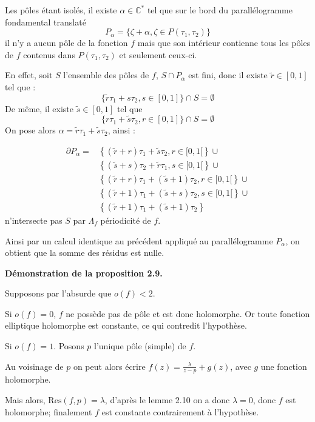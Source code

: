 \documentclass{article}
\begin{document}
Les pôles étant isolés, il existe \( \alpha \in \mathbb{C}^* \) tel que sur le bord du parallélogramme fondamental translaté 
\[
P_\alpha = \{ \zeta + \alpha, \zeta \in P(\tau_1, \tau_2)\}
\]
il n’y a aucun pôle de la fonction \( f \) mais que son intérieur contienne tous les pôles de \( f \) contenus dans \( P(\tau_1, \tau_2) \) et seulement ceux-ci.

En effet, soit \( S \) l'ensemble des pôles de \( f \), \( S \cap P_\alpha \) est fini, donc il existe \(  \tilde{r} \in [0, 1] \) tel que :
\[
\{\tilde{r}\tau_1 + s\tau_2, s \in [0, 1]\} \cap S = \emptyset
\]
De même, il existe \( \tilde{s} \in [0, 1] \) tel que 
\[
\{r\tau_1 + \tilde{s}\tau_2, r \in [0, 1]\} \cap S = \emptyset
\]
On pose alors \( \alpha = \tilde{r}\tau_1 + \tilde{s}\tau_2 \), ainsi :

\begin{align*}
    \partial P_\alpha = & \left\{ (\tilde{r}+r)\tau_1 + \tilde{s}\tau_2, r \in [0, 1[ \right\} \cup \\
                        & \left\{ (\tilde{s}+ s)\tau_2 + \tilde{r}\tau_1, s \in [0, 1[ \right\} \cup \\
                        & \left\{ (\tilde{r} + r)\tau_1 + (\tilde{s} + 1)\tau_2, r \in [0, 1[ \right\} \cup \\
                        & \left\{ (\tilde{r} + 1)\tau_1 + (\tilde{s} + s)\tau_2, s \in [0, 1[ \right\} \cup \\
                        & \left\{ (\tilde{r} + 1)\tau_1 + (\tilde{s} + 1)\tau_2 \right\}
    \end{align*}
n'intersecte pas \( S \) par \( \Lambda_f \) périodicité de \( f \).

Ainsi par un calcul identique au précédent appliqué au parallélogramme \( P_\alpha \), on obtient que la somme des résidus est nulle.


\textbf{Démonstration de la proposition 2.9.}

Supposons par l'absurde que \( o(f) < 2 \).

Si \( o(f) = 0 \), \( f \) ne possède pas de pôle et est donc holomorphe. Or toute fonction elliptique holomorphe est constante, ce qui contredit l'hypothèse.

Si \( o(f) = 1 \). Posons \( p \) l'unique pôle (simple) de \( f \).

Au voisinage de \( p \) on peut alors écrire \( f(z) = \frac{\lambda}{z - p} + g(z) \), avec \( g \) une fonction holomorphe.

Mais alors, \( \text{Res}(f, p) = \lambda \), d'après le lemme 2.10 on a donc \( \lambda = 0 \), donc \( f \) est holomorphe; finalement \( f \) est constante contrairement à l'hypothèse.
\end{document}
